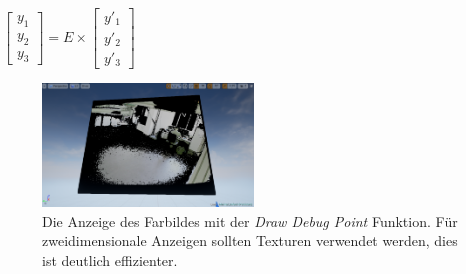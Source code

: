 \documentclass[a4paper]{IEEEtran}
\begin{document}
\begin{center}
$\begin{bmatrix}
y_1 \\
y_2 \\
y_3
\end{bmatrix}
= E
\times
\begin{bmatrix}
y'_1 \\
y'_2 \\
y'_3
\end{bmatrix}$\\[1cm]
\end{center}

\begin{figure}[!h]
    	\centering
		\includegraphics[width=0.5\textwidth]{img/2DColor}
	    \caption{Die Anzeige des Farbildes mit der {\textit{Draw Debug Point}} Funktion. Für zweidimensionale Anzeigen sollten Texturen verwendet werden, dies ist deutlich effizienter.}
    	\label{2DColor}
	\end{figure} 
	
\end{document}
